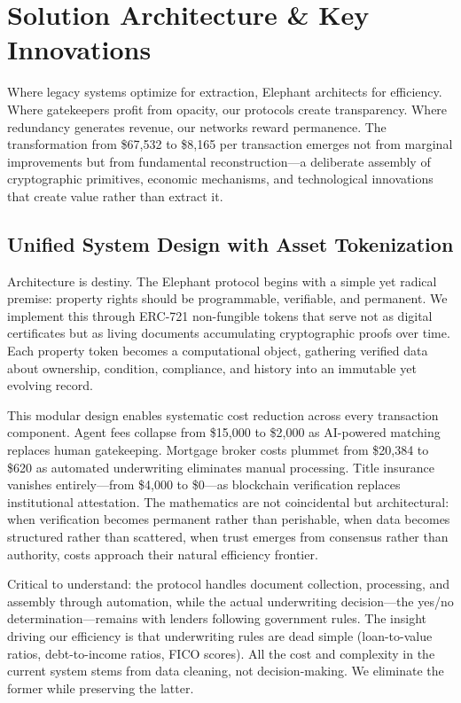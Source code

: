 \chapter{Solution Architecture \& Key Innovations}

Where legacy systems optimize for extraction, Elephant architects for efficiency. Where gatekeepers profit from opacity, our protocols create transparency. Where redundancy generates revenue, our networks reward permanence. The transformation from \$67{,}532 to \$8{,}165 per transaction emerges not from marginal improvements but from fundamental reconstruction—a deliberate assembly of cryptographic primitives, economic mechanisms, and technological innovations that create value rather than extract it.

\section{Unified System Design with Asset Tokenization}

Architecture is destiny. The Elephant protocol begins with a simple yet radical premise: property rights should be programmable, verifiable, and permanent. We implement this through ERC-721 non-fungible tokens that serve not as digital certificates but as living documents accumulating cryptographic proofs over time. Each property token becomes a computational object, gathering verified data about ownership, condition, compliance, and history into an immutable yet evolving record.

This modular design enables systematic cost reduction across every transaction component. Agent fees collapse from \$15{,}000 to \$2{,}000 as AI-powered matching replaces human gatekeeping. Mortgage broker costs plummet from \$20{,}384 to \$620 as automated underwriting eliminates manual processing. Title insurance vanishes entirely—from \$4{,}000 to \$0—as blockchain verification replaces institutional attestation. The mathematics are not coincidental but architectural: when verification becomes permanent rather than perishable, when data becomes structured rather than scattered, when trust emerges from consensus rather than authority, costs approach their natural efficiency frontier.

Critical to understand: the protocol handles document collection, processing, and assembly through automation, while the actual underwriting decision—the yes/no determination—remains with lenders following government rules. The insight driving our efficiency is that underwriting rules are dead simple (loan-to-value ratios, debt-to-income ratios, FICO scores). All the cost and complexity in the current system stems from data cleaning, not decision-making. We eliminate the former while preserving the latter.

